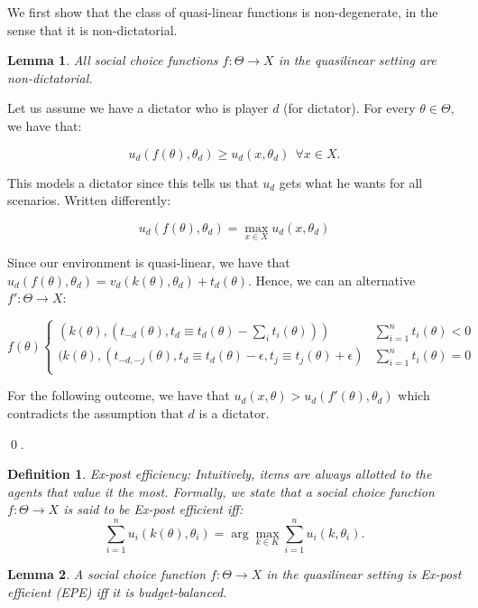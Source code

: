 \documentclass[10pt,a4paper]{article}
\newtheorem{lemma}{Lemma}
\newtheorem{definition}{Definition}
\begin{document}
We first show that the class of quasi-linear functions is non-degenerate,
in the sense that it is non-dictatorial.

\begin{lemma}
All social choice functions $f: \Theta \rightarrow X$
in the quasilinear setting are non-dictatorial.
\end{lemma}
Let us assume we have a dictator who is player $d$ (for dictator).
For every $\theta \in \Theta$, we have that:

$$
u_d(f(\theta), \theta_d) \geq u_d(x, \theta_d) ~~\forall x \in X.
$$

This models a dictator since this tells us that $u_d$ gets what he wants
for all scenarios. Written differently:

$$
u_d(f(\theta), \theta_d) = \max_{x \in X} u_d(x, \theta_d)
$$

Since our environment is quasi-linear, we have that
$u_d(f(\theta), \theta_d) = v_d(k(\theta), \theta_d) + t_d(\theta)$. Hence, 
we can an alternative $f' : \Theta \rightarrow X$:

$$
f(\theta)
\begin{cases}
(k(\theta), (t_{-d}(\theta), t_d \equiv t_d(\theta)  - \sum_i t_i(\theta))) & \sum_{i=1}^n t_i(\theta) < 0 \\
(k(\theta), (t_{-d, -j}(\theta), t_d \equiv t_d(\theta)  - \epsilon, t_j \equiv t_j(\theta) + \epsilon) & \sum_{i=1}^n t_i(\theta) = 0 \\
\end{cases}
$$

For the following outcome, we have that $u_d(x, \theta) > u_d(f'(\theta), \theta_d)$
which contradicts the assumption that $d$ is a dictator.

\qed.


\begin{definition}{Ex-post efficiency:}
Intuitively, items are always allotted to the agents
that value it the most. Formally, we state that a
social choice function $f: \Theta \rightarrow X$ is said to be \emph{Ex-post efficient} iff:
\begin{equation}
\sum_{i=1}^n u_i(k(\theta), \theta_i) = \arg \max_{k \in K} \sum_{i=1}^n u_i(k, \theta_i).
\end{equation}

\end{definition}

\begin{lemma}
A social choice function $f: \Theta \rightarrow X$
in the quasilinear setting is Ex-post efficient (EPE)
iff it is budget-balanced.
\end{lemma}
\end{document}
